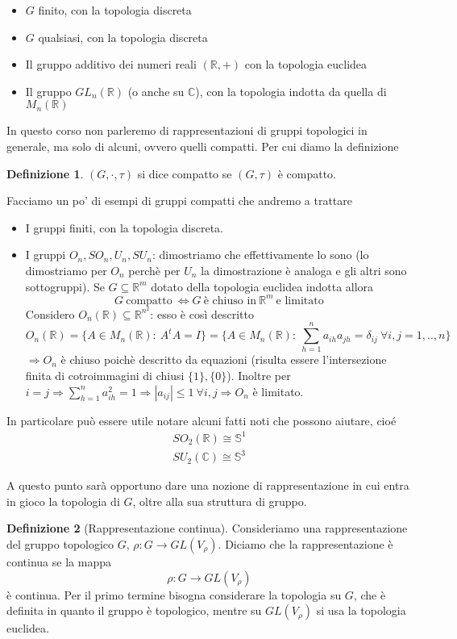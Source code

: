 \documentclass[11pt]{article}
\theoremstyle{plain}
\theoremstyle{definition}
\newtheorem{defn}{Definizione}[section]
\theoremstyle{remark}
\newcommand{\C}{\mathbb{C}}
\newcommand{\R}{\mathbb{R}}
\begin{document}
\begin{itemize}
\item $G$ finito, con la topologia discreta
\item $G$ qualsiasi, con la topologia discreta
\item Il gruppo additivo dei numeri reali $(\R, +)$ con la topologia euclidea
\item Il gruppo $GL_n (\R)$ (o anche su $\C$), con la topologia indotta da quella di $M_n(\R)$

\end{itemize}


In questo corso non parleremo di rappresentazioni di gruppi topologici in generale, ma solo di alcuni, ovvero quelli compatti. Per cui diamo la definizione

\begin{defn}
$(G, \cdot, \tau)$ si dice compatto se $(G, \tau)$ è compatto.
\end{defn}


Facciamo un po' di esempi di gruppi compatti che andremo a trattare
\begin{itemize}
\item I gruppi finiti, con la topologia discreta.
\item I gruppi $O_n, SO_n, U_n, SU_n$: dimostriamo che effettivamente lo sono (lo dimostriamo per $O_n$ perchè per $U_n$ la dimostrazione è analoga e gli altri sono sottogruppi).
Se $G\subseteq \R^m$ dotato della topologia euclidea indotta allora
\[G\ \text{compatto}\ \Leftrightarrow G\ \text{è chiuso in}\ \R^m\ \text{e limitato}\]
Considero $O_n(\R)\subseteq \R^{n^2}$: esso è così descritto
\[O_n(\R)=\{A\in M_n(\R):\ A^tA=I\}=\{A\in M_n(\R):\ \sum_{h=1}^{n}a_{ih}a_{jh}=\delta_{ij}\ \forall i,j=1,..,n\}\]
$\Rightarrow O_n$ è chiuso poichè descritto da equazioni (risulta essere l'intersezione finita di cotroimmagini di chiusi $\{1\},\{0\}$). Inoltre per $i=j\Rightarrow \sum_{h=1}^n a_{ih}^2=1\Rightarrow |a_{ij}|\leq 1\ \forall i,j\Rightarrow O_n$ è limitato.
\end{itemize}

In particolare può essere utile notare alcuni fatti noti che possono aiutare, cioé
\begin{align*}
SO_2(\R) \cong \mathbb{S}^1 \\
SU_2(\C) \cong \mathbb{S}^3
\end{align*}

A questo punto sarà opportuno dare una nozione di rappresentazione in cui entra in gioco la topologia di $G$, oltre alla sua struttura di gruppo. 
\begin{defn}[Rappresentazione continua]
Consideriamo una rappresentazione del gruppo topologico $G$, $\rho: G \to GL(V_\rho)$. Diciamo che la rappresentazione è continua se la mappa
\[ \rho: G \to GL(V_\rho)\]
è continua. Per il primo termine bisogna considerare la topologia su $G$, che è definita in quanto il gruppo è topologico, mentre su $GL(V_\rho)$ si usa la topologia euclidea. 
\end{defn}
\end{document}
